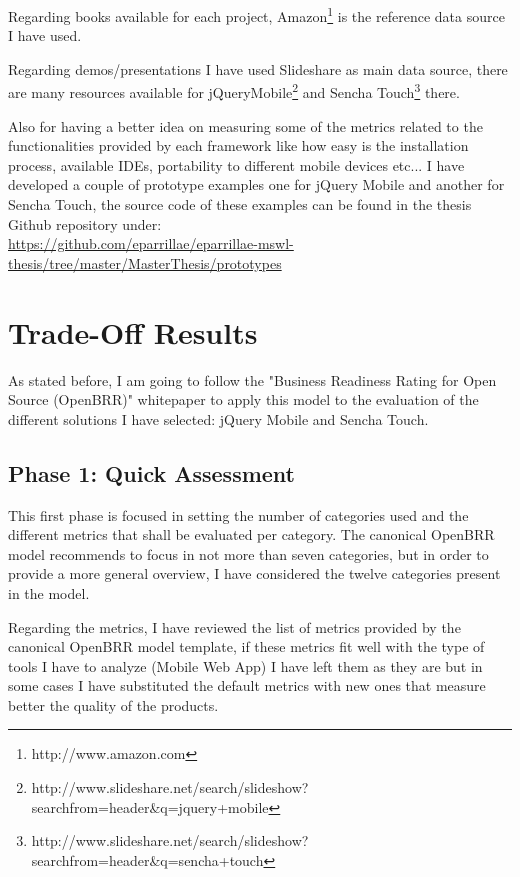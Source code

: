 \documentclass[a4paper,12pt]{book}
\begin{document}
Regarding books available for each project, Amazon\footnote{http://www.amazon.com} is the reference data source I have used.

Regarding demos/presentations I have used Slideshare as main data source, there are many resources available for jQueryMobile\footnote{http://www.slideshare.net/search/slideshow?searchfrom=header\&q=jquery+mobile}  and Sencha Touch\footnote{http://www.slideshare.net/search/slideshow?searchfrom=header\&q=sencha+touch}  there.

Also for having a better idea on measuring some of the metrics related to the functionalities provided by each framework like how easy is the installation process, available IDEs, portability to different mobile devices etc... I have developed a couple of prototype examples one for jQuery Mobile and another for Sencha Touch, the source code of these examples can be found in the thesis Github repository under:\\

\url{https://github.com/eparrillae/eparrillae-mswl-thesis/tree/master/MasterThesis/prototypes}


\chapter{Trade-Off Results}
\label{chap:results}

As stated before, I am going to follow the "Business Readiness Rating for Open Source
(OpenBRR)" whitepaper\cite{OpenBRRWhitepaper} to apply this model to the evaluation of the different solutions I have selected: jQuery Mobile and Sencha Touch.

\section{Phase 1: Quick Assessment}
\label{sec:phase1}
This first phase is focused in setting the number of categories used and the different metrics that shall be evaluated per category. The canonical OpenBRR model recommends to focus in not more than seven categories, but in order to provide a more general overview, I have considered the twelve categories present in the model.

Regarding the metrics, I have reviewed the list of metrics provided by the canonical OpenBRR model template, if these metrics fit well with the type of tools I have to analyze (Mobile Web App) I have left them as they are but in some cases I have substituted the default metrics with new ones that measure better the quality of the products.
\end{document}
